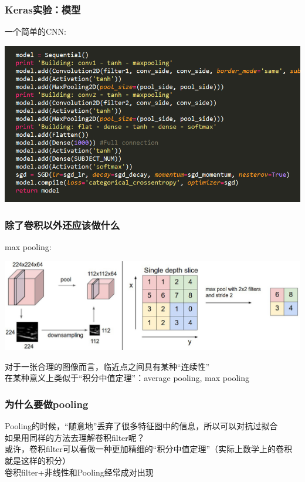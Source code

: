 \documentclass[24pt]{beamer}
\begin{document}
\begin{frame}
\frametitle{Keras实验：模型}
一个简单的CNN:\\
\begin{center}
\includegraphics[width=1\linewidth]{./fig13.png}
\end{center}
\end{frame}
\begin{frame}
\frametitle{除了卷积以外还应该做什么}
max pooling:\\
\begin{center}
\includegraphics[width=0.8\linewidth]{./fig14.jpg}
\end{center}
对于一张合理的图像而言，临近点之间具有某种“连续性”\\
在某种意义上类似于“积分中值定理”：average pooling, max pooling
\end{frame}
\begin{frame}
\frametitle{为什么要做pooling}
Pooling的时候，“随意地”丢弃了很多特征图中的信息，所以可以对抗过拟合\\
如果用同样的方法去理解卷积filter呢？\\
或许，卷积filter可以看做一种更加精细的“积分中值定理”（实际上数学上的卷积就是这样的积分）\\
卷积filter+非线性和Pooling经常成对出现\\
 
\end{frame}
\end{document}
